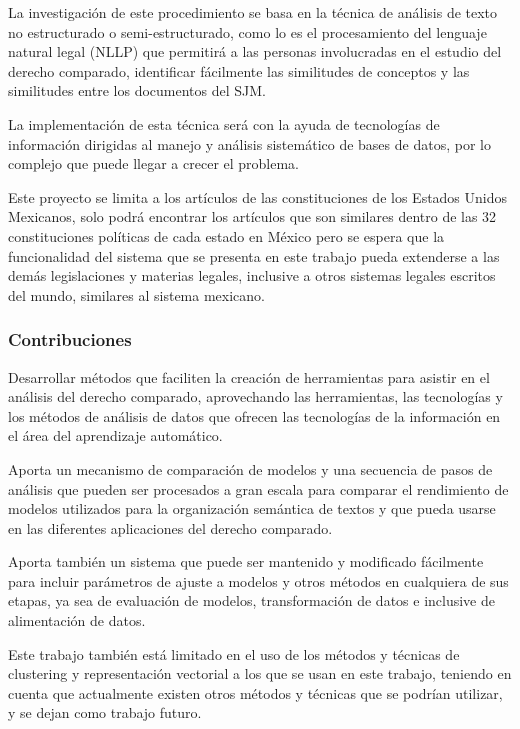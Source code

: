 \documentclass[12pt]{article}
\begin{document}
			La investigación de este procedimiento se basa en la técnica de análisis de texto no estructurado o semi-estructurado, como lo es el procesamiento del lenguaje natural legal (NLLP) que permitirá a las personas involucradas en el estudio del derecho comparado, identificar fácilmente las similitudes de conceptos y las similitudes entre los documentos  del SJM.	
			
			La implementación de esta técnica será con la ayuda de tecnologías de información dirigidas al manejo y análisis sistemático de bases de datos, por lo complejo que puede llegar a crecer el problema. 
			
			Este proyecto se limita a los artículos de las constituciones de los Estados Unidos Mexicanos, solo podrá encontrar los artículos que son similares dentro de las 32 constituciones políticas de cada estado en México pero se espera que la funcionalidad del sistema que se presenta en este trabajo pueda extenderse a las demás legislaciones y materias legales, inclusive a otros sistemas legales escritos del mundo, similares al sistema mexicano.
			

			\subsubsection{Contribuciones}
			Desarrollar métodos que faciliten la creación de herramientas para asistir en el análisis del derecho comparado, aprovechando las herramientas, las tecnologías y los métodos de análisis de datos que ofrecen las tecnologías de la información en el área del aprendizaje automático. 
		
			Aporta un mecanismo de comparación de modelos y una secuencia de pasos de análisis que pueden ser procesados a gran escala para comparar el rendimiento de modelos utilizados para la organización semántica de textos y que pueda usarse en las diferentes aplicaciones del derecho comparado.
			
			Aporta también un sistema que puede ser mantenido y modificado fácilmente para incluir parámetros de ajuste a modelos y otros métodos en cualquiera de sus etapas, ya sea de evaluación de modelos, transformación de datos e inclusive de alimentación de datos.
			
			Este trabajo también está limitado en el uso de los métodos y técnicas de clustering y representación vectorial a los que se usan en este trabajo, teniendo en cuenta que actualmente existen otros métodos y técnicas que se podrían utilizar, y se dejan como trabajo futuro.
				
\end{document}
